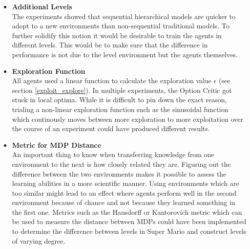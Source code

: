 \documentclass[notitlepage,a4paper,11pt]{article}
\begin{document}
\begin{itemize}
	
	\item
	\textbf{Additional Levels}\\
	The experiments showed that sequential hierarchical models are quicker to adopt to a new environments than non-sequential traditional models. To further solidify this notion it would be desirable to train the agents in different levels. This would be to make sure that the difference in performance is not due to the level environment but the agents themselves.
	
	\item	
	\textbf{Exploration Function}\\
	All agents used a linear function to calculate the exploration value $\epsilon$ (see section \ref{exploit_explore}). In multiple experiments, the Option Critic got stuck in local optima. While it is difficult to pin down the exact reason, trialing a non-linear exploration function such as the sinusoidal function \cite{chuchro2017game} which continously moves between more exploration to more exploitation over the course of an experiment could have produced different results. 
	
	\item
	\textbf{Metric for MDP Distance}\\
	An important thing to know when transferring knowledge from one environment to the next is how closely related they are. Figuring out the difference between the two environments makes it possible to assess the learning abilities in a more scientific manner. Using environments which are too similar might lead to an effect where agents perform well in the second environment because of chance and not because they learned something in the first one. Metrics such as the Hausdorff or Kantorovich metric which can be used to measure the distance between MDPs \cite{song2016measuring} could have been implemented to determine the difference between levels in Super Mario and construct levels of varying degree.
	
	

\end{itemize}
\end{document}
